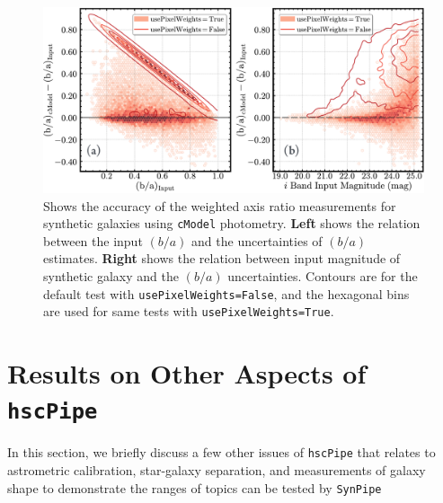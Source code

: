 \documentclass[useamsfonts]{pasj01}
\def\hscpipe{\texttt{hscPipe}}
\def\synpipe{\texttt{SynPipe}}
\def\cmodel{\texttt{cModel}}
\begin{document}
\begin{figure}
    \begin{center}
        \includegraphics[width=\textwidth]{fig/synpipe_galaxy_ba}
    \end{center}
    \caption{
        Shows the accuracy of the weighted axis ratio measurements for synthetic
        galaxies using \cmodel{} photometry.
        \textbf{Left} shows the relation between the input $(b/a)$ and the
        uncertainties of $(b/a)$ estimates.
        \textbf{Right} shows the relation between input magnitude of synthetic galaxy
        and the $(b/a)$ uncertainties.
        Contours are for the default test with \texttt{usePixelWeights=False}, and the
        hexagonal bins are used for same tests with \texttt{usePixelWeights=True}.
        }
    \label{fig:galaxy_ba}
\end{figure}



\section{Results on Other Aspects of \hscpipe{}}
    \label{sec:others}

    In this section, we briefly discuss a few other issues of \hscpipe{} that relates 
    to astrometric calibration, star-galaxy separation, and measurements of galaxy 
    shape to demonstrate the ranges of topics can be tested by \synpipe{}
    
\end{document}
